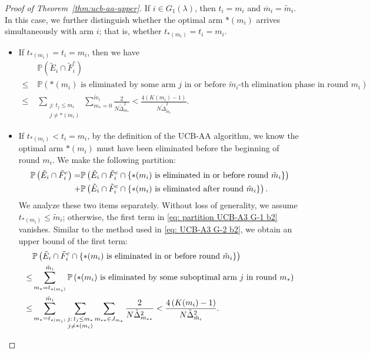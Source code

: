 \documentclass[11pt]{article}
\begin{document}
\begin{proof}[Proof of Theorem~\ref{thm:ucb-aa-upper}]
If $i\in G_1(\lambda)$, then $t_i=m_i$ and $\overline{m}_i=\tilde{m}_i$. In this case, we further distinguish whether the optimal arm $*(m_i)$ arrives simultaneously with arm $i$; that is, whether $t_{*(m_i)}=t_i=m_i$.
\begin{itemize}
    \item If $t_{*(m_i)}=t_i=m_i$, then we have
    \begin{align*}
        &\mathbb{P}\left(\tilde{E}_i\cap\tilde{F}_i^c\right)\\
        \!\!\!\!\!\!\!\!\!\leq \;&\mathbb{P}\left(*(m_i) \text{ is eliminated by some arm } j \text{ in or before $\tilde{m}_i$-th elimination phase in round } m_i\right) \\
        \leq \;& \sum_{\substack{j :\,t_j\leq m_i\\j\neq *(m_i)}}\sum_{m_{*}=0}^{\tilde{m}_i}\frac{2}{N \tilde{\Delta}_{m_{*}}^2}<\frac{4\left(K(m_i)-1\right)}{N\tilde{\Delta}_{\tilde{m}_i}^2}.
    \end{align*}
    \item If $t_{*(m_i)}<t_i=m_i$, by the definition of the UCB-AA algorithm, we know the optimal arm $*(m_i)$ must have been eliminated before the beginning of round $m_i$. We make the following partition:
\begin{align}
\mathbb{P}\left(\tilde{E}_i\cap\tilde{F}_i^c\right)=&\mathbb{P}\left(\tilde{E}_i\cap\tilde{F}_i^c\cap\{\text{$*(m_i)$ is eliminated in or before round }\tilde{m}_i\}\right)\notag\\
+&\mathbb{P}\left(\tilde{E}_i\cap\tilde{F}_i^c\cap\{\text{$*(m_i)$ is eliminated after round }\tilde{m}_i\}\right).
\label{eq: partition UCB-A3 G-1 b2}
\end{align}
We analyze these two items separately. Without loss of generality, we assume $t_{*(m_i)}\leq \tilde{m}_i$; otherwise, the first term in \eqref{eq: partition UCB-A3 G-1 b2} vanishes. Similar to the method used in \eqref{eq: UCB-A3 G-2 b2}, we obtain an upper bound of the first term:
\begin{align}
    &\mathbb{P}\left(\tilde{E}_i\cap\tilde{F}_i^c\cap\{\text{$*(m_i)$ is eliminated in or before round }\tilde{m}_i\}\right)\notag\\
\leq &\sum _{m_*=t_{*(m_i)}}^{\tilde{m}_i} \mathbb{P}\left(*(m_i) \text{ is eliminated by some suboptimal arm } j \text{ in round } m_*\right)\notag \\
\leq & \sum_{m_* = t_{*(m_i)}}^{\tilde{m}_i} \sum_{\substack{j :\,t_j\leq m_*\\j\neq *(m_i)}}\sum_{m_{**}\in J_{m_*}} \frac{2}{N \tilde{\Delta}_{m_{**}}^2}<\frac{4\left(K(m_i)-1\right)}{N\tilde{\Delta}_{\tilde{m}_i}^2}.

\end{align}
\end{itemize}
\end{proof}
\end{document}
